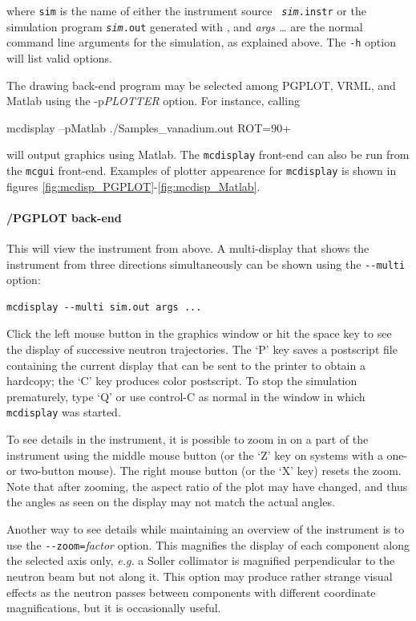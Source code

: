 where \verb+sim+ is the name of either the instrument source \texttt{{\it
    sim}.instr} or the simulation program \texttt{{\it sim}.out} generated with
\MCS, and \textit{args \ldots} are the normal command line arguments for the
simulation, as explained above. The \verb+-h+ option will list valid options.

 
 The drawing back-end program may be selected among
PGPLOT, VRML, and Matlab using the -p{\it PLOTTER} option. For instance, calling
\begin{bash}
mcdisplay --pMatlab ./Samples_vanadium.out ROT=90+
\end{bash}
will output graphics using Matlab.
The \verb+mcdisplay+ front-end can also be run from the \verb+mcgui+ front-end.
Examples of plotter appearence for \verb+mcdisplay+ is shown in figures
 \ref{fig:mcdisp_PGPLOT}-\ref{fig:mcdisp_Matlab}.

\paragraph{\MCS /PGPLOT back-end}

This will view the instrument from above. A multi-display that shows the
instrument from three directions simultaneously can be shown using the
\verb+--multi+ option:
\begin{lstlisting}
mcdisplay --multi sim.out args ...
\end{lstlisting}

Click the left mouse button in the graphics window or hit the space key to see
the display of successive neutron trajectories. The `P' key saves a postscript
file containing the current display that can be sent to the printer to obtain a
hardcopy; the `C' key produces color postscript.  To stop the simulation
prematurely, type `Q' or use control-C as normal in the window in which
\verb+mcdisplay+ was started.

To see details in the instrument, it is possible to zoom in on a part of the
instrument using the middle mouse button (or the `Z' key on systems with a one-
or two-button mouse). The right mouse button (or the `X' key) resets the
zoom. Note that after zooming, the aspect ratio of the plot may have changed,
and thus the angles as seen on the display may not match the actual angles.

Another way to see details while maintaining an overview of the instrument is to
use the \verb+--zoom=+\textit{factor} option. This magnifies the display of each
component along the selected axis only, {\em e.g.} a Soller collimator is
magnified perpendicular to the neutron beam but not along it. This option may
produce rather strange visual effects as the neutron passes between components
with different coordinate magnifications, but it is occasionally useful.


